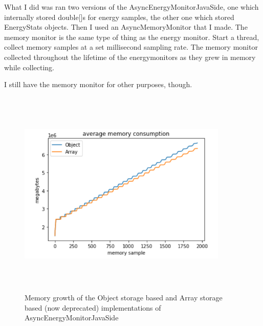 \documentclass{article}
\begin{document}
    What I did was ran two versions of the AsyncEnergyMonitorJavaSide, one which internally stored double[]s for
    energy samples, the other one which stored EnergyStats objects. Then I used an AsyncMemoryMonitor that I made.
    The memory monitor is the same type of thing as the energy monitor. Start a thread, collect memory samples at a
    set millisecond sampling rate. The memory monitor collected throughout the lifetime of the energymonitors as
    they grew in memory while collecting.
    
    I still have the memory monitor for other purposes, though.

    \begin{figure}[H]
    	\centering
    	\includegraphics[width=10cm,height=10cm,keepaspectratio]{MemoryFootprint/ArrayVsObjectStorage_(deprecated)/average_memory_consumption.png}
    	\caption{Memory growth of the Object storage based and Array storage based (now deprecated) implementations
    	of AsyncEnergyMonitorJavaSide}
    	\label{fig:avg-sample-PKG}
    \end{figure}
    
\end{document}
